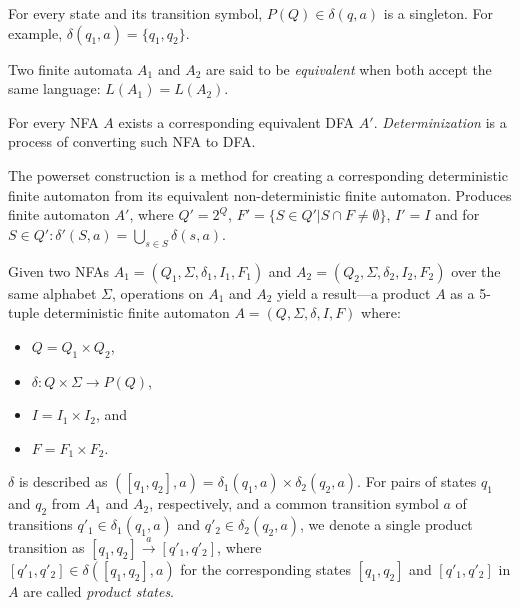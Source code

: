 For every state and its transition symbol, $P(Q) \in \delta(q, a)$ is a singleton. For example, $\delta(q_1, a) = \{ q_1, q_2 \}$.

Two finite automata $A_1$ and $A_2$ are said to be \emph{equivalent} when both accept the same language: $L(A_1) = L(A_2)$.

For every NFA $A$ exists a corresponding equivalent DFA $A'$. \emph{Determinization} is a process of converting such NFA to DFA.

\begin{definition} \hfill \newline
    The powerset construction is a method for creating a corresponding deterministic finite automaton from its equivalent non-deterministic finite automaton. Produces finite automaton $A'$, where $Q' = 2^Q$, $F' = \{S \in Q' | S \cap F \neq \emptyset\}$, $I' = I$ and for $S \in Q': \delta'(S, a) = \bigcup_{s \in S} \delta(s, a)$.
\end{definition}

\begin{definition} \hfill \newline
Given two NFAs $A_1 = (Q_1, \Sigma, \delta_1, I_1, F_1)$ and $A_2 = (Q_2, \Sigma, \delta_2, I_2, F_2)$ over the same alphabet $\Sigma$, operations on $A_1$ and $A_2$ yield a result---a product $A$ as a 5-tuple deterministic finite automaton $A = (Q, \Sigma, \delta, I, F)$ where:
\begin{itemize}
    \item $Q = Q_1 \times Q_2$,
    \item $\delta: Q \times \Sigma \rightarrow{} P(Q)$,
    \item $I = I_1 \times I_2$, and
    \item $F = F_1 \times F_2$.
\end{itemize}
\end{definition}

$\delta$ is described as $([q_1, q_2], a) = \delta_1(q_1, a) \times \delta_2(q_2, a)$. For pairs of states $q_1$ and $q_2$ from $A_1$ and $A_2$, respectively, and a common transition symbol $a$ of transitions $q'_1 \in \delta_1(q_1, a)$ and $q'_2 \in \delta_2(q_2,a)$, we denote a single product transition as $[q_1, q_2] \xrightarrow{a} [q'_1, q'_2]$, where \\ $[q'_1, q'_2] \in \delta([q_1, q_2], a)$ for the corresponding states $[q_1, q_2]$ and $[q'_1, q'_2]$ in $A$ are called \emph{product states}.

